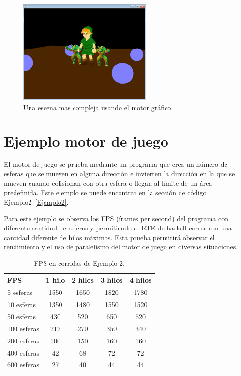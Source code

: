 \begin{figure}[!ht!]
\centering
\includegraphics[width=0.6\textwidth]{link}
\caption[Ejemplo 2]{Una escena mas compleja usando el motor gráfico.}
\label{fig:Ejemplo_2}
\end{figure}

\section{Ejemplo motor de juego}

El motor de juego se prueba mediante un programa que crea un número de esferas que se mueven en alguna dirección e invierten la dirección en la que se mueven cuando colisionan con otra esfera o llegan al límite de un área predefinida. Este ejemplo se puede encontrar en la sección de código Ejemplo2~\ref{Ejemplo2}.

Para este ejemplo se observa los FPS (frames per second) del programa con diferente cantidad de esferas y permitiendo al RTE de haskell correr con una cantidad diferente de hilos máximos. Esta prueba permitirá observar el rendimiento y el uso de paralelismo del motor de juego en diversas situaciones.

\begin{table}
\begin{tabular}{ | l | c | c | c | c | }
 \hline
 FPS & 1 hilo &2 hilos&3 hilos&4 hilos\\
 \hline
 5 esferas & 1550	& 1650	& 1820	& 1780 \\ \hline
 10 esferas & 1350	& 1480	& 1550	& 1520 \\ \hline
 50 esferas & 430	& 520	& 650	& 620 \\ \hline
 100 esferas & 212	& 270	& 350	& 340 \\ \hline
 200 esferas & 100	& 150	& 160	& 160 \\ \hline
 400 esferas & 42	& 68	& 72	& 72 \\ \hline
 600 esferas & 27	& 40	& 44	& 44 \\
 \hline
\end{tabular}
\caption{FPS en corridas de Ejemplo 2.}
\label{table:Ejemplo2}
\end{table}

